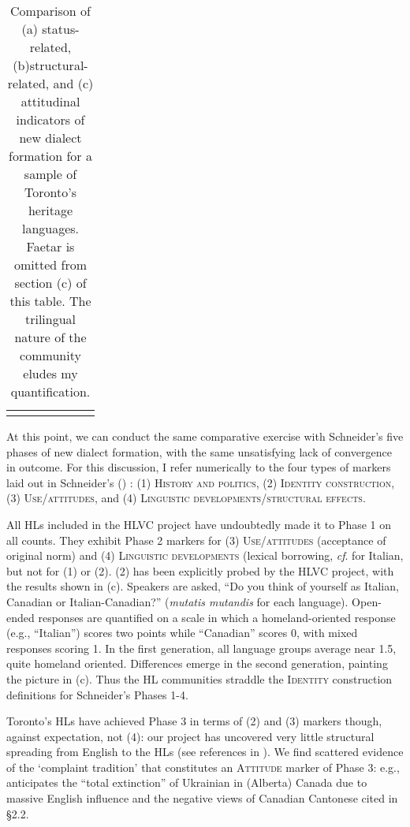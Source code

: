 \documentclass[output=paper]{LSP/langsci}
\begin{document}
\begin{table}
\begin{tabular}{lllllll}
\lspbottomrule
\end{tabular}
\caption{Comparison of (a) status-related, (b)structural-related, and (c) attitudinal indicators of new dialect formation for a sample of Toronto’s heritage languages. %
Faetar is omitted from section (c) of this table. The trilingual nature of the community eludes my quantification.}
\label{tab:1}
\end{table}

At this point, we can conduct the same comparative exercise with Schneider’s five phases of new dialect formation, with the same unsatisfying lack of convergence in outcome. For this discussion, I refer numerically to the four types of markers laid out in Schneider’s (\citeyear[255]{schneider_dynamics_2003}) : \textsc{(1) History and politics, (2) Identity construction, (3) Use/attitudes}, and\textsc{ (4) Linguistic developments/structural effects.}

All HLs included in the HLVC project have undoubtedly made it to Phase 1 on all counts. They exhibit Phase 2 markers for \textsc{(3) Use/attitudes} (acceptance of original norm) and \textsc{(4) Linguistic developments} (lexical borrowing, \textit{cf}. \citet{danesi_canadian_1983} for Italian, but not for \textsc{(1)} or \textsc{(2). (2)} has been explicitly probed by the HLVC project, with the results shown in  (c). Speakers are asked, “Do you think of yourself as Italian, Canadian or Italian-Canadian?” (\textit{mutatis mutandis} for each language). Open-ended responses are quantified on a scale in which a homeland-oriented response (e.g., “Italian”) scores two points while “Canadian” scores 0, with mixed responses scoring 1. In the first generation, all language groups average near 1.5, quite homeland oriented. Differences emerge in the second generation, painting the picture in  (c). Thus the HL communities straddle the \textsc{Identity} construction definitions for Schneider’s Phases 1-4. 

Toronto’s HLs have achieved Phase 3 in terms of \textsc{(2) }and \textsc{(3) }markers though, against expectation, not \textsc{(4)}: our project has uncovered very little structural spreading from English to the HLs (see references in ). We find scattered evidence of the ‘complaint tradition’ that constitutes an \textsc{Attitude} marker of Phase 3: e.g., \citet{struk_between_2000} anticipates the “total extinction” of Ukrainian in (Alberta) Canada due to massive English influence and the negative views of Canadian Cantonese cited in §2.2. 
\end{document}
